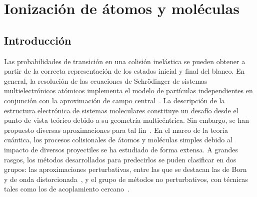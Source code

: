 \chapter{Ionización de átomos y moléculas}
\label{chap:iondim}

\section{Introducción}

Las probabilidades de transición en una colisión inelástica se pueden 
obtener a partir de la correcta representación de los estados inicial y 
final del blanco. En general, la resolución de las ecuaciones de 
Schr\"odinger de sistemas multielectrónicos atómicos implementa el 
modelo de partículas independientes en conjunción con la aproximación 
de campo central~\cite{Bransden:03,Cowan:81}. La descripción de la 
estructura electrónica de sistemas moleculares constituye un desafío 
desde el punto de vista teórico debido a su geometría multicéntrica. Sin 
embargo, se han propuesto diversas aproximaciones para tal 
fin~\cite{Helgaker:00,Schaefer:04}. 
En el marco de la teoría cuántica, los procesos colisionales de átomos 
y moléculas simples debido al impacto de diversos proyectiles se ha 
estudiado de forma extensa. A grandes rasgos, los métodos desarrollados
para predecirlos se puden clasificar en dos grupos: las aproximaciones 
perturbativas, entre las que se destacan las de Born~\cite{Bates:62,
McDowell:61} y de onda distorcionada~\cite{Crothers:10,Rivarola:87}, y 
el grupo de métodos no perturbativos, con técnicas tales como los de 
acoplamiento cercano~\cite{Pindzola:07,Burke:11,Bray:17}. 

